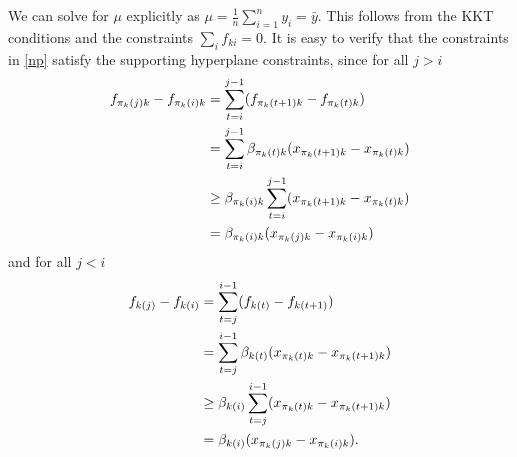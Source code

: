 We can solve for $\mu$ explicitly as  
$\mu = \frac{1}{n} \sum_{i=1}^n y_i = \bar{y}$.  This follows from the
KKT conditions
and the constraints $\sum_i f_{ki} = 0$.
It is easy to verify that the constraints in \eqref{np} satisfy the
supporting hyperplane constraints, since
for all $j > i$
\begin{align*}
  f_{\pi_k(j)k}-f_{\pi_k(i)k}  & = \sum\limits_{t=i}^{j-1}(f_{\pi_k(t+1)k}-f_{\pi_k(t)k}) \\
   &= \sum\limits_{t=i}^{j-1}\beta_{\pi_k(t)k}(x_{\pi_k(t+1)k}-x_{\pi_k(t)k}) \\
   &\geq \beta_{\pi_k(i)k}\sum\limits_{t=i}^{j-1}(x_{\pi_k(t+1)k}-x_{\pi_k(t)k}) \\
  & = \beta_{\pi_k(i)k}(x_{\pi_k(j)k}-x_{\pi_k(i)k}) 
\end{align*}
and for all $j < i$
\begin{align*}
f_{k(j)}-f_{k(i)} & =
    \sum\limits_{t=j}^{i-1}(f_{k(t)}-f_{k(t+1)}) \\
     & = \sum\limits_{t=j}^{i-1}\beta_{k(t)}(x_{\pi_k(t)k}-x_{\pi_k(t+1)k}) \\
     &\geq \beta_{k(i)}\sum\limits_{t=j}^{i-1}(x_{\pi_k(t)k}-x_{\pi_k(t+1)k}) \\
     & = \beta_{k(i)}(x_{\pi_k(j)k}-x_{\pi_k(i)k}).
\end{align*}



